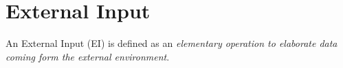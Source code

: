 \section{External Input}
An External Input (EI) is defined as an \emph{elementary operation to elaborate data coming form the external environment}.
